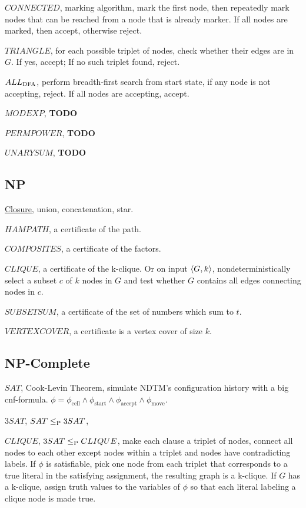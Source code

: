 \hyperref[lang:CONNECTED_P]{$CONNECTED$}, marking algorithm, mark the first node, then repeatedly mark nodes that can be reached from a node that is already marker. If all nodes are marked, then accept, otherwise reject.

\hyperref[lang:TRIANGLE_P]{$TRIANGLE$}, for each possible triplet of nodes, check whether their edges are in $G$. If yes, accept; If no such triplet found, reject.

\hyperref[lang:ALLDFA_P]{$ALL_\DFA$}, perform breadth-first search from start state, if any node is not accepting, reject. If all nodes are accepting, accept.

\hyperref[lang:MODEXP_P]{$MODEXP$}, \textbf{TODO}

\hyperref[lang:PERMPOWER_P]{$PERMPOWER$}, \textbf{TODO}

\hyperref[lang:UNARYSSUM_P]{$UNARYSUM$}, \textbf{TODO}

\subsection{NP}
\hyperref[exe:NP_CLOSURE]{Closure}, union, concatenation, star.

\hyperref[lang:HAMPATH_NP]{$HAMPATH$}, a certificate of the path.

\hyperref[lang:COMPOSITES_NP]{$COMPOSITES$}, a certificate of the factors.

\hyperref[lang:CLIQUE_NP]{$CLIQUE$}, a certificate of the k-clique. Or on input $\desc{G, k}$, nondeterministically select a subset $c$ of $k$ nodes in $G$ and test whether $G$ contains all edges connecting nodes in $c$.

\hyperref[lang:SUBSETSUM_NP]{$SUBSETSUM$}, a certificate of the set of numbers which sum to $t$.

\hyperref[lang:VERTEXCOVER_NP]{$VERTEXCOVER$}, a certificate is a vertex cover of size $k$.

\subsection{NP-Complete}

\hyperref[lang:SAT]{$SAT$}, Cook-Levin Theorem, simulate NDTM's configuration history with a big cnf-formula. $\phi = \phi_\text{cell} \wedge \phi_\text{start} \wedge \phi_\text{accept} \wedge \phi_\text{move}$.

\hyperref[lang:3SAT_NPC]{$3SAT$}, $SAT \leq_\P 3SAT$, 

\hyperref[lang:3SAT_CLIQUE]{$CLIQUE$}, $3SAT \leq_\P CLIQUE$, make each clause a triplet of nodes, connect all nodes to each other except nodes within a triplet and nodes have contradicting labels. If $\phi$ is satisfiable, pick one node from each triplet that corresponds to a true literal in the satisfying assignment, the resulting graph is a k-clique. If $G$ has a k-clique, assign truth values to the variables of $\phi$ so that each literal labeling a clique node is made true.

